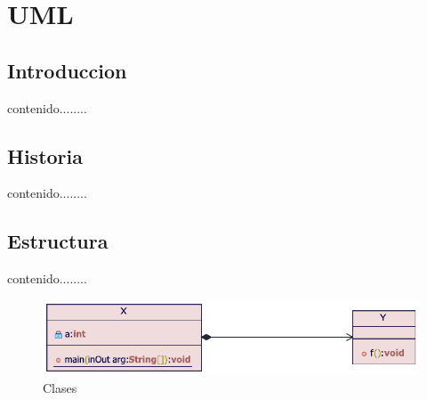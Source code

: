 \chapter{UML\cite{UML_2,Iak,Ira,Rai}}
\section{Introduccion}
contenido........
\newpage
\section{Historia}
contenido........
\newpage

\section{Estructura}
contenido........

\begin{figure}[h]
	\centering
	\includegraphics[width=0.7\linewidth]{imgs/clases}
	\caption{Clases}
\end{figure}

%

\newpage